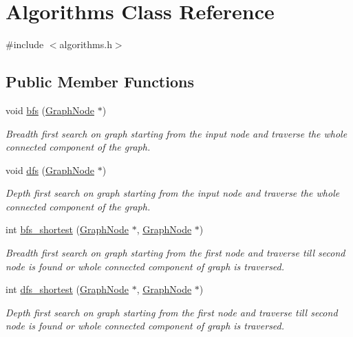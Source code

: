 \hypertarget{classAlgorithms}{\section{\-Algorithms \-Class \-Reference}
\label{classAlgorithms}
}


{\ttfamily \#include $<$algorithms.\-h$>$}

\subsection*{\-Public \-Member \-Functions}
\begin{DoxyCompactItemize}
\item 
void \hyperlink{classAlgorithms_a28ae4d8d83ba5351b9589ed21dccaa64}{bfs} (\hyperlink{structGraphNode}{\-Graph\-Node} $\ast$)
\begin{DoxyCompactList}\small\item\em \-Breadth first search on graph starting from the input node and traverse the whole connected component of the graph. \end{DoxyCompactList}\item 
void \hyperlink{classAlgorithms_a055ca9200bb41109721eb332aab710eb}{dfs} (\hyperlink{structGraphNode}{\-Graph\-Node} $\ast$)
\begin{DoxyCompactList}\small\item\em \-Depth first search on graph starting from the input node and traverse the whole connected component of the graph. \end{DoxyCompactList}\item 
int \hyperlink{classAlgorithms_a632f4fd1b849ad48a20d671c9c681903}{bfs\-\_\-shortest} (\hyperlink{structGraphNode}{\-Graph\-Node} $\ast$, \hyperlink{structGraphNode}{\-Graph\-Node} $\ast$)
\begin{DoxyCompactList}\small\item\em \-Breadth first search on graph starting from the first node and traverse till second node is found or whole connected component of graph is traversed. \end{DoxyCompactList}\item 
int \hyperlink{classAlgorithms_aff3cab25b1a219714965a6a820740836}{dfs\-\_\-shortest} (\hyperlink{structGraphNode}{\-Graph\-Node} $\ast$, \hyperlink{structGraphNode}{\-Graph\-Node} $\ast$)
\begin{DoxyCompactList}\small\item\em \-Depth first search on graph starting from the first node and traverse till second node is found or whole connected component of graph is traversed. \end{DoxyCompactList}\item 

\end{DoxyCompactItemize}
